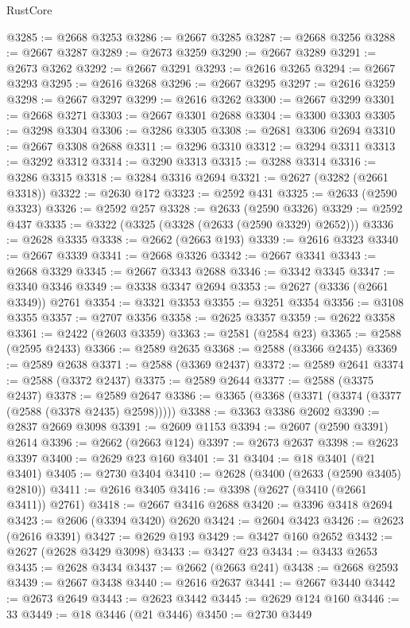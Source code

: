 \begin{lexlean}{RustCore}
\begin{coremodule}
@3285 := @2668 @3253
@3286 := @2667 @3285
@3287 := @2668 @3256
@3288 := @2667 @3287
@3289 := @2673 @3259
@3290 := @2667 @3289
@3291 := @2673 @3262
@3292 := @2667 @3291
@3293 := @2616 @3265
@3294 := @2667 @3293
@3295 := @2616 @3268
@3296 := @2667 @3295
@3297 := @2616 @3259
@3298 := @2667 @3297
@3299 := @2616 @3262
@3300 := @2667 @3299
@3301 := @2668 @3271
@3303 := @2667 @3301 @2688
@3304 := @3300 @3303
@3305 := @3298 @3304
@3306 := @3286 @3305
@3308 := @2681 @3306 @2694
@3310 := @2667 @3308 @2688
@3311 := @3296 @3310
@3312 := @3294 @3311
@3313 := @3292 @3312
@3314 := @3290 @3313
@3315 := @3288 @3314
@3316 := @3286 @3315
@3318 := @3284 @3316 @2694
@3321 := @2627 (@3282 (@2661 @3318))
@3322 := @2630 @172
@3323 := @2592 @431
@3325 := @2633 (@2590 @3323)
@3326 := @2592 @257
@3328 := @2633 (@2590 @3326)
@3329 := @2592 @437
@3335 := @3322 (@3325 (@3328 (@2633 (@2590 @3329) @2652)))
@3336 := @2628 @3335
@3338 := @2662 (@2663 @193)
@3339 := @2616 @3323
@3340 := @2667 @3339
@3341 := @2668 @3326
@3342 := @2667 @3341
@3343 := @2668 @3329
@3345 := @2667 @3343 @2688
@3346 := @3342 @3345
@3347 := @3340 @3346
@3349 := @3338 @3347 @2694
@3353 := @2627 (@3336 (@2661 @3349)) @2761
@3354 := @3321 @3353
@3355 := @3251 @3354
@3356 := @3108 @3355
@3357 := @2707 @3356
@3358 := @2625 @3357
@3359 := @2622 @3358
@3361 := @2422 (@2603 @3359)
@3363 := @2581 (@2584 @23)
@3365 := @2588 (@2595 @2433)
@3366 := @2589 @2635
@3368 := @2588 (@3366 @2435)
@3369 := @2589 @2638
@3371 := @2588 (@3369 @2437)
@3372 := @2589 @2641
@3374 := @2588 (@3372 @2437)
@3375 := @2589 @2644
@3377 := @2588 (@3375 @2437)
@3378 := @2589 @2647
@3386 := @3365 (@3368 (@3371 (@3374 (@3377 (@2588 (@3378 @2435) @2598)))))
@3388 := @3363 @3386 @2602
@3390 := @2837 @2669 @3098
@3391 := @2609 @1153
@3394 := @2607 (@2590 @3391) @2614
@3396 := @2662 (@2663 @124)
@3397 := @2673 @2637
@3398 := @2623 @3397
@3400 := @2629 @23 @160
@3401 := 31
@3404 := @18 @3401 (@21 @3401)
@3405 := @2730 @3404
@3410 := @2628 (@3400 (@2633 (@2590 @3405) @2810))
@3411 := @2616 @3405
@3416 := @3398 (@2627 (@3410 (@2661 @3411)) @2761)
@3418 := @2667 @3416 @2688
@3420 := @3396 @3418 @2694
@3423 := @2606 (@3394 @3420) @2620
@3424 := @2604 @3423
@3426 := @2623 (@2616 @3391)
@3427 := @2629 @193
@3429 := @3427 @160 @2652
@3432 := @2627 (@2628 @3429 @3098)
@3433 := @3427 @23
@3434 := @3433 @2653
@3435 := @2628 @3434
@3437 := @2662 (@2663 @241)
@3438 := @2668 @2593
@3439 := @2667 @3438
@3440 := @2616 @2637
@3441 := @2667 @3440
@3442 := @2673 @2649
@3443 := @2623 @3442
@3445 := @2629 @124 @160
@3446 := 33
@3449 := @18 @3446 (@21 @3446)
@3450 := @2730 @3449

\end{coremodule}
\end{lexlean}
